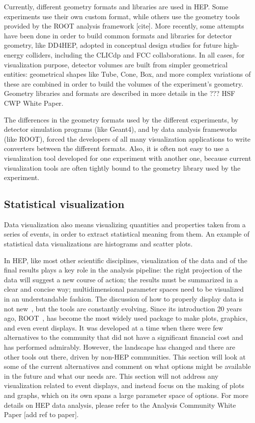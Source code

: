 \documentclass[12pt,a4paper]{article}
\begin{document}
Currently, different geometry formats and libraries are used in HEP. Some experiments use their own custom format,
while others use the geometry tools provided by the ROOT analysis framework [cite]. More recently, some attempts have been
done in order to build common formats and libraries for detector geometry, like DD4HEP,  adopted in conceptual design studies
for future high-energy colliders, including the CLICdp and FCC collaborations. In all cases, for visualization purpose, detector
volumes are built from simpler geometrical entities: geometrical shapes like Tube, Cone, Box, and more complex variations of these
are combined in order to build the volumes of the experiment’s geometry. Geometry libraries and formats are described in more details
in the ??? HSF CWP White Paper.

The differences in the geometry formats used by the different experiments, by detector simulation programs (like Geant4),
and by data analysis frameworks (like ROOT), forced the developers of all many visualization applications to write converters
between the different formats. Also, it is often not easy to use a visualization tool developed for one experiment with another one,
because current visualization tools are often tightly bound to the geometry library used by the experiment.

\hypertarget{statistical-visualization}{%
\subsection{Statistical visualization}\label{statistical-visualization}}

Data visualization also means visualizing quantities and properties taken from a series of events, in order to extract statistical
meaning from them. An example of statistical data visualizations are histograms and scatter plots.

In HEP, like most other scientific disciplines, visualization of the data and of the final results plays a key role in the
analysis pipeline: the right projection of the data will suggest a new course of action; the results must be summarized in a
clear and concise way; multidimensional parameter spaces need to be visualized in an understandable fashion. The discussion
of how to properly display data is not new~\cite{Tufte1986}, but the tools are constantly evolving. Since its introduction 20 years ago,
ROOT~\cite{Root1997}, has become the most widely used package to make plots, graphics, and even event displays. It was developed at a
time when there were few alternatives to the community that did not have a significant financial cost and has performed admirably.
However, the landscape has changed and there are other tools out there, driven by non-HEP communities. This section will look at
some of the current alternatives and comment on what options might be available in the future and what our needs are. This section
will not address any visualization related to event displays, and instead focus on the making of plots and graphs, which on its own
spans a large parameter space of options. For more details on HEP data analysis, please refer to the Analysis Community White Paper
[add ref to paper].
\end{document}
